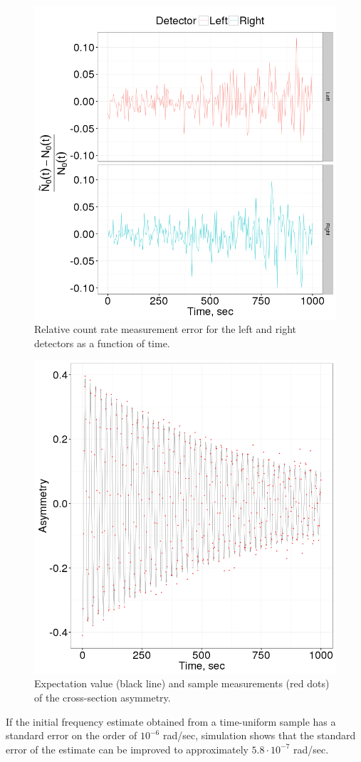 \documentclass{article}
\newcommand{\vp}[2]{{#1}\cdot 10^{#2}}
\begin{document}
\begin{figure}[h]
	\centering
	\includegraphics[width=\textwidth]{img/LR_detector_relErr}
	\caption{Relative count rate measurement error for the left and right detectors as a function of time.\label{fig:LRDetErr}}
\end{figure}

\begin{figure}[h]
	\centering
	\includegraphics[width=\textwidth]{img/Asymmetry}
	\caption{Expectation value (black line) and sample measurements (red dots) of the cross-section asymmetry.\label{fig:Asym}}
\end{figure}

If the initial frequency estimate obtained from a time-uniform sample has a standard error on the order of $10^{-6}$ rad/sec, simulation shows that the standard error of the estimate can be improved to approximately $\vp{5.8}{-7}$ rad/sec.
\end{document}
